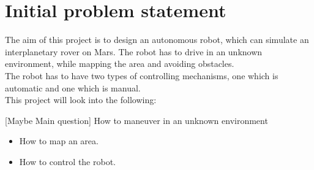 \chapter{Initial problem statement}

The aim of this project is to design an autonomous robot, which can simulate an interplanetary rover on Mars. The robot has to drive in an unknown environment, while mapping the area and avoiding obstacles.\\ The robot has to have two types of controlling mechanisms, one which is automatic and one which is manual.\\
This project will look into the following:

[Maybe Main question] How to maneuver in an unknown environment
\begin{itemize}
\item How to map an area.
\item How to control the robot.
\end{itemize}











